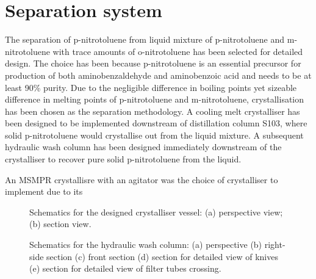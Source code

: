\section*{Separation system}

The separation of p-nitrotoluene from liquid mixture of p-nitrotoluene and m-nitrotoluene with trace amounts of o-nitrotoluene has been selected for detailed design. The choice has been because p-nitrotoluene is an essential precursor for production of both aminobenzaldehyde and aminobenzoic acid and needs to be at least 90\% purity. Due to the negligible difference in boiling points yet sizeable difference in melting points of p-nitrotoluene and m-nitrotoluene, crystallisation has been chosen as the separation methodology. A cooling melt crystalliser has been designed to be implemented downstream of distillation column S103, where solid p-nitrotoluene would crystallise out from the liquid mixture. A subsequent hydraulic wash column has been designed immediately downstream of the crystalliser to recover pure solid p-nitrotoluene from the liquid. 


An MSMPR crystallisre with an agitator was the choice of crystalliser to implement due to its 




\begin{figure}[h]
    \centering
    
    \caption{Schematics for the designed crystalliser vessel: (a) perspective view; (b) section view.}
    \label{fig:crystalliser schematic executive}
\end{figure}

\begin{figure}[h]
    \centering
    
    \caption{Schematics for the hydraulic wash column: (a) perspective (b) right-side section (c) front section (d) section for detailed view of knives (e) section for detailed view of filter tubes crossing.}
    \label{fig:wash column schematic executive}
\end{figure}
